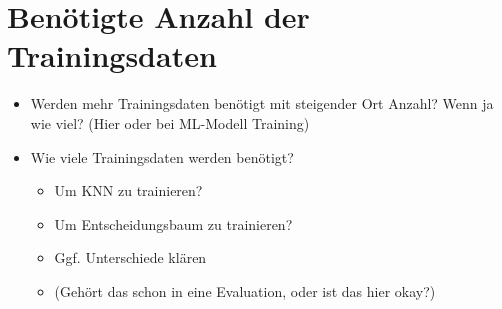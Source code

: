 \section{Benötigte Anzahl der Trainingsdaten}
\begin{itemize}
    \item Werden mehr Trainingsdaten benötigt mit steigender Ort Anzahl? Wenn ja wie viel? (Hier oder bei ML-Modell Training)
    \item Wie viele Trainingsdaten werden benötigt?
    \begin{itemize}
        \item Um KNN zu trainieren?
        \item Um Entscheidungsbaum zu trainieren?
        \item Ggf. Unterschiede klären
        \item (Gehört das schon in eine Evaluation, oder ist das hier okay?)
    \end{itemize}
\end{itemize}


